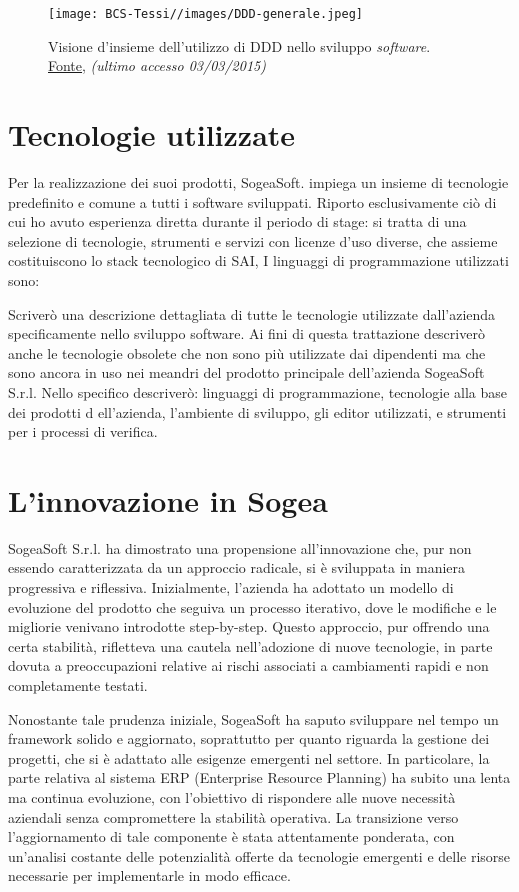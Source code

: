         \begin{figure}[H]
            \centering
            \texttt{[image: BCS-Tessi//images/DDD-generale.jpeg]}
            \caption{Visione d'insieme dell'utilizzo di DDD nello sviluppo \textit{software}. \href{https://medium.com/raa-labs/part-1-domain-driven-design-like-a-pro-f9e78d081f10}{Fonte}, \textit{(ultimo accesso 03/03/2015)}}
            \label{fig:DDD-riassunto}
        \end{figure}
    \section{Tecnologie utilizzate}
    Per la realizzazione dei suoi prodotti, SogeaSoft. impiega un insieme di tecnologie predefinito e comune a tutti i software sviluppati. Riporto esclusivamente ciò di cui ho avuto esperienza diretta durante il periodo di stage: si tratta di una selezione di tecnologie, strumenti e servizi con licenze d’uso diverse, che assieme costituiscono lo stack tecnologico di SAI,
I linguaggi di programmazione utilizzati sono:


    Scriverò una descrizione dettagliata di tutte le tecnologie utilizzate dall’azienda specificamente nello
    sviluppo software. Ai fini di questa trattazione descriverò anche le tecnologie obsolete che non sono
    più utilizzate dai dipendenti ma che sono ancora in uso nei meandri del prodotto principale
    dell’azienda SogeaSoft S.r.l.
    Nello specifico descriverò: linguaggi di programmazione, tecnologie alla base dei prodotti
    d   ell’azienda, l’ambiente di sviluppo, gli editor utilizzati, e       strumenti per i processi di verifica.
    \section{L’innovazione in Sogea}

    SogeaSoft S.r.l. ha dimostrato una propensione all'innovazione che, pur non essendo caratterizzata da un approccio radicale, si è sviluppata in maniera progressiva e riflessiva. Inizialmente, l'azienda ha adottato un modello di evoluzione del prodotto che seguiva un processo iterativo, dove le modifiche e le migliorie venivano introdotte step-by-step. Questo approccio, pur offrendo una certa stabilità, rifletteva una cautela nell'adozione di nuove tecnologie, in parte dovuta a preoccupazioni relative ai rischi associati a cambiamenti rapidi e non completamente testati.

Nonostante tale prudenza iniziale, SogeaSoft ha saputo sviluppare nel tempo un framework solido e aggiornato, soprattutto per quanto riguarda la gestione dei progetti, che si è adattato alle esigenze emergenti nel settore. In particolare, la parte relativa al sistema ERP (Enterprise Resource Planning) ha subito una lenta ma continua evoluzione, con l'obiettivo di rispondere alle nuove necessità aziendali senza compromettere la stabilità operativa. La transizione verso l'aggiornamento di tale componente è stata attentamente ponderata, con un'analisi costante delle potenzialità offerte da tecnologie emergenti e delle risorse necessarie per implementarle in modo efficace.

